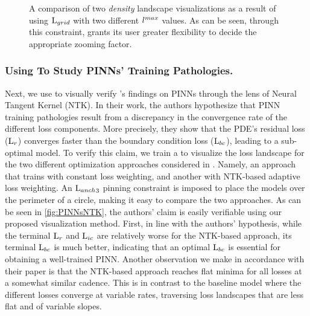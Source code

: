 \documentclass[letterpaper]{article} %
\begin{document}
\begin{figure}[htb]
          \caption{A comparison of two \proposedautencoder{} \textit{density} landscape visualizations as a result of using $\text{L}_{grid}$ with two different $l^{max}$ values. As can be seen, through this constraint, \proposedautencoder{} grants its user greater flexibility to decide the appropriate zooming factor.}
          \label{fig:Lgrid}
        \end{figure}







         \subsubsection{Using \proposedautencoder{} To Study PINNs' Training Pathologies.} \label{ss:NTK}
         Next, we use \proposedautencoder{} to visually verify \cite{wang2020and}'s findings on PINNs through the lens of Neural Tangent Kernel (NTK). In their work, the authors hypothesize that PINN training pathologies result from a discrepancy in the convergence rate of the different loss components. More precisely, they show that the PDE's residual loss ($\text{L}_{r}$) converges faster than the boundary condition loss ($\text{L}_{bc}$), leading to a sub-optimal model. To verify this claim, we train a \proposedautencoder{} to visualize the loss landscape for the two different optimization approaches considered in \cite{wang2020and}. Namely, an approach that trains with constant loss weighting, and another with NTK-based adaptive loss weighting. An ${\text{L}_{anch}}_3$ pinning constraint is imposed to place the models over the perimeter of a circle, making it easy to compare the two approaches. As can be seen in \cref{fig:PINNsNTK}, the authors' claim is easily verifiable using our proposed visualization method. First, in line with the authors' hypothesis, while the terminal $\text{L}_{r}$ and $\text{L}_{ic}$ are relatively worse for the NTK-based approach, its terminal $\text{L}_{bc}$ is much better, indicating that an optimal $\text{L}_{bc}$ is essential for obtaining a well-trained PINN. Another observation we make in accordance with their paper is that the NTK-based approach reaches flat minima for all losses at a somewhat similar cadence. This is in contrast to the baseline model where the different losses converge at variable rates, traversing loss landscapes that are less flat and of variable slopes. 
\end{document}
